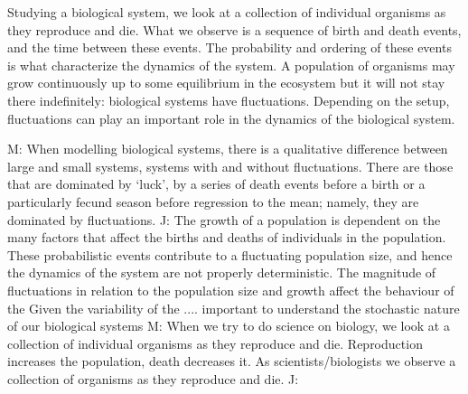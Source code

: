 Studying a biological system, we look at a collection of individual organisms as they reproduce and die. 
What we observe is a sequence of birth and death events, and the time between these events. 
The probability and ordering of these events is what characterize the dynamics of the system. 
A population of organisms may grow continuously up to some equilibrium in the ecosystem but it will not stay there indefinitely: biological systems have fluctuations. 
Depending on the setup, fluctuations can play an important role in the dynamics of the biological system. %

\iffalse
M: When modelling biological systems, there is a qualitative difference between large and small systems, systems with and without fluctuations. There are those that are dominated by `luck’, by a series of death events before a birth or a particularly fecund season before regression to the mean; namely, they are dominated by fluctuations. 
J: The growth of a population is dependent on the many factors that affect the births and deaths of individuals in the population.
These probabilistic events contribute to a fluctuating population size, and hence the dynamics of the system are not properly deterministic.
The magnitude of fluctuations in relation to the population size and growth affect the behaviour of the 
Given the variability of the .... important to understand the stochastic nature of our biological systems
M: %
When we try to do science on biology, we look at a collection of individual organisms as they reproduce and die. Reproduction increases the population, death decreases it. 
As scientists/biologists we observe a collection of organisms as they reproduce and die. 
J: %

